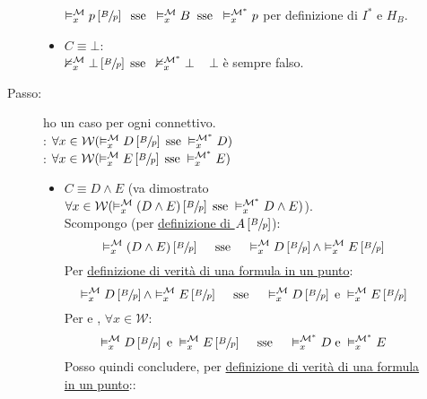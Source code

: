 \documentclass[a4paper,12pt]{article}
\newcommand{\latinmodern}[1]{\text{#1}}
\newcommand{\latinmath}[1]{\text{\latinmodern{#1}}} %
\begin{document}
\begin{description}
\begin{dimo}
\begin{dimo}
\begin{description}
\begin{itemize}
					                  $\vDash_x^{\mathcal{M}} p \left[\sfrac{B}{p}\right] \;\; \text{sse} \;\; \vDash_x^{\mathcal{M}} B \;\; \text{sse} \;\; \vDash_x^{\mathcal{M^{\ast}}} p$ \quad per definizione di $I^{\ast}$ e $H_B$.
					            \item $C \equiv \bot$: \\
					                  $\nvDash_x^{\mathcal{M}} \bot \left[\sfrac{B}{p}\right] \; \text{sse} \;\; \nvDash_x^{\mathcal{M^{\ast}}} \bot$ \qquad \qquad \quad $\; \; \, \bot$ è sempre falso.
				            \end{itemize}
				      \item[Passo:] ho un caso per ogni connettivo.\\
				            \latinmath{IH1}: \emph{$\forall x \in \mathcal{W} (\vDash_x^{\mathcal{M}} D\left[\sfrac{B}{p}\right] \; \text{sse} \; \vDash_x^{\mathcal{M^{\ast}}} D)$} \\
				            \latinmath{IH2}: \emph{$\forall x \in \mathcal{W} (\vDash_x^{\mathcal{M}} E\left[\sfrac{B}{p}\right] \; \text{sse} \; \vDash_x^{\mathcal{M^{\ast}}} E)$}
				            \begin{itemize}
					            \item $C \equiv D \land E$ (va dimostrato \emph{$\forall x \in \mathcal{W} (\vDash_x^{\mathcal{M}} (D \land E)\left[\sfrac{B}{p}\right] \; \text{sse} \; \vDash_x^{\mathcal{M^{\ast}}} D \land E)$}). \\
					                  Scompongo (per \hyperlink{defsu}{definizione di $A \left[\sfrac{B}{p}\right]$}):
					                  $$\vDash_x^{\mathcal{M}} (D \land E)\left[\sfrac{B}{p}\right] \quad\; \text{sse} \quad\; \vDash_x^{\mathcal{M}} D\left[\sfrac{B}{p}\right] \land \vDash_x^{\mathcal{M}} E\left[\sfrac{B}{p}\right]$$
					                  Per \hyperlink{defverp}{definizione di verità di una formula in un punto}:
					                  $$\vDash_x^{\mathcal{M}} D\left[\sfrac{B}{p}\right] \land \vDash_x^{\mathcal{M}} E\left[\sfrac{B}{p}\right] \quad\; \text{sse} \quad\; \vDash_x^{\mathcal{M}} D\left[\sfrac{B}{p}\right] \; \text{e} \; \vDash_x^{\mathcal{M}} E\left[\sfrac{B}{p}\right]$$
					                  Per \latinmath{IH1} e \latinmath{IH2}, $\forall x \in \mathcal{W}$:
					                  $$\vDash_x^{\mathcal{M}} D\left[\sfrac{B}{p}\right] \; \text{e} \; \vDash_x^{\mathcal{M}} E\left[\sfrac{B}{p}\right] \quad\; \text{sse} \quad\; \vDash_x^{\mathcal{M^{\ast}}} D \; \text{e} \; \vDash_x^{\mathcal{M^{\ast}}} E$$
					                  Posso quindi concludere, per \hyperlink{defverp}{definizione di verità di una formula in un punto}::

\end{itemize}
\end{description}
\end{dimo}
\end{dimo}
\end{description}
\end{document}
